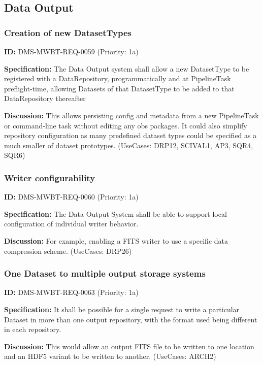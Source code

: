 \documentclass[SE,toc,lsstdraft]{lsstdoc}
\begin{document}
\subsection{Data Output}

\subsubsection{Creation of new DatasetTypes}

\label{DMS-MWBT-REQ-0059}
\textbf{ID:} DMS-MWBT-REQ-0059 (Priority: 1a)

\textbf{Specification:}
The Data Output system shall allow a new DatasetType to be registered with a DataRepository, programmatically and at PipelineTask preflight-time, allowing Datasets of that DatasetType to be added to that DataRepository thereafter

\textbf{Discussion:}
This allows persisting config and metadata from a new PipelineTask or command-line task without editing any obs packages. It could also simplify repository configuration as many predefined dataset types could be specified as a much smaller of dataset prototypes. (UseCases: DRP12, SCIVAL1, AP3, SQR4, SQR6)

\subsubsection{Writer configurability}

\label{DMS-MWBT-REQ-0060}
\textbf{ID:} DMS-MWBT-REQ-0060 (Priority: 1a)

\textbf{Specification:}
The Data Output System shall be able to support local configuration of individual writer behavior.

\textbf{Discussion:}
For example, enabling a FITS writer to use a specific data compression scheme. (UseCases: DRP26)

\subsubsection{One Dataset to multiple output storage systems}

\label{DMS-MWBT-REQ-0063}
\textbf{ID:} DMS-MWBT-REQ-0063 (Priority: 1a)

\textbf{Specification:}
It shall be possible for a single request to write a particular Dataset in more than one output repository, with the format used being different in each repository.

\textbf{Discussion:}
This would allow an output FITS file to be written to one location and an HDF5 variant to be written to another. (UseCases: ARCH2)
\end{document}
